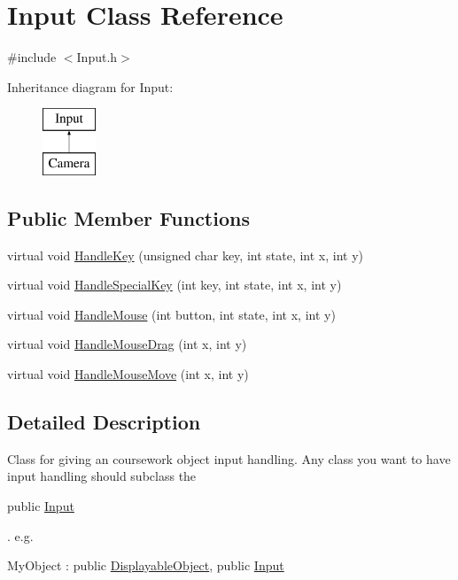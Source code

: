 \hypertarget{class_input}{}\section{Input Class Reference}
\label{class_input}


{\ttfamily \#include $<$Input.\+h$>$}

Inheritance diagram for Input\+:\begin{figure}[H]
\begin{center}
\leavevmode
\includegraphics[height=2.000000cm]{class_input}
\end{center}
\end{figure}
\subsection*{Public Member Functions}
\begin{DoxyCompactItemize}
\item 
virtual void \hyperlink{class_input_a376e4472a9f3621238d6513252949366}{Handle\+Key} (unsigned char key, int state, int x, int y)
\item 
virtual void \hyperlink{class_input_adccce536f10dfe4b1de2bb22ed8ae538}{Handle\+Special\+Key} (int key, int state, int x, int y)
\item 
virtual void \hyperlink{class_input_a85fe43236eb168699ec57b37ab022741}{Handle\+Mouse} (int button, int state, int x, int y)
\item 
virtual void \hyperlink{class_input_abb590b1b9684b966340a8377ab0d00e2}{Handle\+Mouse\+Drag} (int x, int y)
\item 
virtual void \hyperlink{class_input_a89177666298fbef2797c677d486bc628}{Handle\+Mouse\+Move} (int x, int y)
\end{DoxyCompactItemize}


\subsection{Detailed Description}
Class for giving an coursework object input handling. Any class you want to have input handling should subclass the
\begin{DoxyCode}
\textcolor{keyword}{public} \hyperlink{class_input}{Input} 
\end{DoxyCode}
 . e.\+g.
\begin{DoxyCode}
MyObject : \textcolor{keyword}{public} \hyperlink{class_displayable_object}{DisplayableObject}, \textcolor{keyword}{public} \hyperlink{class_input}{Input} 
\end{DoxyCode}
 


